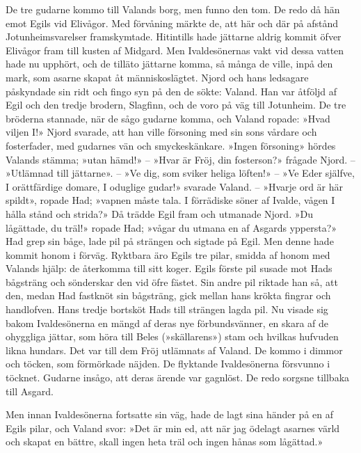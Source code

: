 De tre gudarne kommo till Valands borg, men funno den tom. De redo då
hän emot Egils vid Elivågor. Med förvåning märkte de, att här och där på
afstånd Jotunheimsvarelser framskymtade. Hitintills hade jättarne aldrig
kommit öfver Elivågor fram till kusten af Midgard. Men Ivaldesönernas
vakt vid dessa vatten hade nu upphört, och de tilläto jättarne komma, så
många de ville, inpå den mark, som asarne skapat åt människoslägtet.
Njord och hans ledsagare påskyndade sin ridt och fingo syn på den de
sökte: Valand. Han var åtföljd af Egil och den tredje brodern, Slagfinn,
och de voro på väg till Jotunheim. De tre bröderna stannade, när de sågo
gudarne komma, och Valand ropade: »Hvad viljen I!» Njord svarade, att
han ville försoning med sin sons vårdare och fosterfader, med gudarnes
vän och smyckeskänkare. »Ingen försoning» hördes Valands stämma; »utan
hämd!» -- »Hvar är Fröj, din fosterson?» frågade Njord. -- »Utlämnad
till jättarne». -- »Ve dig, som sviker heliga löften!» -- »Ve Eder
själfve, I orättfärdige domare, I oduglige gudar!» svarade Valand. --
»Hvarje ord är här spildt», ropade Had; »vapnen måste tala. I förrädiske
söner af Ivalde, vågen I hålla stånd och strida?» Då trädde Egil fram
och utmanade Njord. »Du lågättade,
\protect\hypertarget{lb1625905.xhtmlux5cux23start79}{}{}\protect\hypertarget{lb1625905.xhtmlux5cux23start79-a}{}{}\protect\hypertarget{lb1625905.xhtmlux5cux23start79-b}{}{}\protect\hypertarget{lb1625905.xhtmlux5cux23start79-c}{}{}\protect\hypertarget{lb1625905.xhtmlux5cux23start79-d}{}{}
du träl!» ropade Had; »vågar du utmana en af Asgards yppersta?» Had grep
sin båge, lade pil på strängen och sigtade på Egil. Men denne hade
kommit honom i förväg. Ryktbara äro Egils tre pilar, smidda af honom med
Valands hjälp: de återkomma till sitt koger. Egils förste pil susade mot
Hads bågsträng och sönderskar den vid öfre fästet. Sin andre pil riktade
han så, att den, medan Had fastknöt sin bågsträng, gick mellan hans
krökta fingrar och handlofven. Hans tredje bortsköt Hads till strängen
lagda pil. Nu visade sig bakom Ivaldesönerna en mängd af deras nye
förbundsvänner, en skara af de ohyggliga jättar, som höra till Beles
(»skällarens») stam och hvilkas hufvuden likna hundars. Det var till dem
Fröj utlämnats af Valand. De kommo i dimmor och töcken, som förmörkade
näjden. De flyktande Ivaldesönerna försvunno i töcknet. Gudarne insågo,
att deras ärende var gagnlöst. De redo sorgsne tillbaka till Asgard.

Men innan Ivaldesönerna fortsatte sin väg, hade de lagt sina händer på
en af Egils pilar, och Valand svor: »Det är min ed, att när jag ödelagt
asarnes värld och skapat en bättre, skall ingen heta träl och ingen
hånas som lågättad.»

